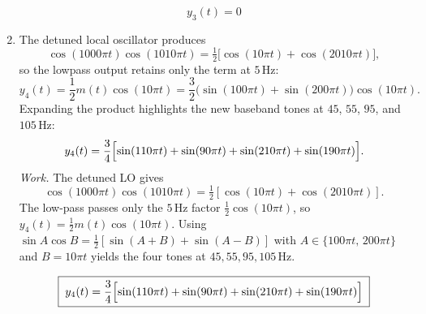\documentclass[12pt]{article}
\newcommand{\answer}[1]{\boxed{\;#1\;}}
\begin{document}
\begin{enumerate}[label=\textbf{(\alph*)}]
    \[
      \answer{y_3(t)=0}
    \]

  \item
    The detuned local oscillator produces
    \[
      \cos(1000\pi t)\cos(1010\pi t) = \tfrac{1}{2}\bigl[\cos(10\pi t)+\cos(2010\pi t)\bigr],
    \]
    so the lowpass output retains only the term at $5\,\text{Hz}$:
    \[
      y_4(t) = \frac{1}{2} m(t)\cos(10\pi t)
              = \frac{3}{2}\bigl(\sin(100\pi t)+\sin(200\pi t)\bigr)\cos(10\pi t).
    \]
    Expanding the product highlights the new baseband tones at $45$, $55$, $95$, and $105\,\text{Hz}$:
    \[
      y_4(t) = \frac{3}{4}\Bigl[\sin(110\pi t)+\sin(90\pi t)+\sin(210\pi t)+\sin(190\pi t)\Bigr].
    \]
    \emph{Work.} The detuned LO gives
    \[
      \cos(1000\pi t)\cos(1010\pi t)=\tfrac{1}{2}\!\left[\cos(10\pi t)+\cos(2010\pi t)\right].
    \]
    The low-pass passes only the \(5\,\text{Hz}\) factor \(\tfrac{1}{2}\cos(10\pi t)\), so
    \(y_4(t)=\tfrac{1}{2}m(t)\cos(10\pi t)\).
    Using \(\sin A\cos B=\tfrac{1}{2}\left[\sin(A{+}B)+\sin(A{-}B)\right]\) with \(A\in\{100\pi t,\,200\pi t\}\) and \(B=10\pi t\) yields the four tones at \(45,55,95,105\,\text{Hz}\).

    \[
      \answer{y_4(t)=\frac{3}{4}\Bigl[\sin(110\pi t)+\sin(90\pi t)+\sin(210\pi t)+\sin(190\pi t)\Bigr]}
    \]
\end{enumerate}

\end{document}
